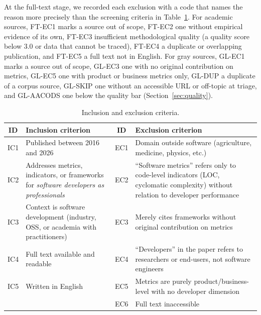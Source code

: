 \documentclass[preprint,number]{elsarticle}
\begin{document}
At the full-text stage, we recorded each exclusion with a code that names the reason more precisely than the screening criteria in Table~\ref{tab:criteria}. For academic sources, FT-EC1 marks a source out of scope, FT-EC2 one without empirical evidence of its own, FT-EC3 insufficient methodological quality (a quality score below 3.0 or data that cannot be traced), FT-EC4 a duplicate or overlapping publication, and FT-EC5 a full text not in English. For gray sources, GL-EC1 marks a source out of scope, GL-EC3 one with no original contribution on metrics, GL-EC5 one with product or business metrics only, GL-DUP a duplicate of a corpus source, GL-SKIP one without an accessible URL or off-topic at triage, and GL-AACODS one below the quality bar (Section~\ref{sec:quality}).


\begin{table}[htbp]
\centering
\caption{Inclusion and exclusion criteria.}
\label{tab:criteria}
\footnotesize
\setlength{\tabcolsep}{4pt}
\begin{tabular}{c >{\raggedright\arraybackslash}p{4.6cm} c >{\raggedright\arraybackslash}p{5.2cm}}
\toprule
\rowcolor{white} \textbf{ID} & \textbf{Inclusion criterion} & \textbf{ID} & \textbf{Exclusion criterion} \\
\midrule
IC1 & Published between 2016 and 2026 & EC1 & Domain outside software (agriculture, medicine, physics, etc.) \\
IC2 & Addresses metrics, indicators, or frameworks for \textit{software developers as professionals} & EC2 & ``Software metrics'' refers only to code-level indicators (LOC, cyclomatic complexity) without relation to developer performance \\
IC3 & Context is software development (industry, OSS, or academia with practitioners) & EC3 & Merely cites frameworks without original contribution on metrics \\
IC4 & Full text available and readable & EC4 & ``Developers'' in the paper refers to researchers or end-users, not software engineers \\
IC5 & Written in English & EC5 & Metrics are purely product/business-level with no developer dimension \\
 &  & EC6 & Full text inaccessible \\
\bottomrule
\end{tabular}
\end{table}
\end{document}
